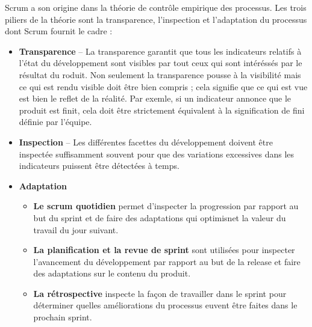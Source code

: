 \documentclass[12pt,a4paper,openany]{article}
\begin{document}
	Scrum a son origine dans la théorie de contrôle empirique des processus. Les trois piliers de la théorie sont la transparence, l'inspection et l'adaptation du processus dont Scrum fournit le cadre :
	\begin{itemize}
		\item \textbf{Transparence} -- La transparence garantit que tous les indicateurs relatifs à l'état du développement sont visibles par tout ceux qui sont intéréssés
			par le résultat du roduit. Non seulement la transparence pousse à la visibilité mais ce qui est rendu visible doit être bien compris ; 
			cela signifie que ce qui est vue est bien le reflet de la réalité. Par exemle, si un indicateur annonce que le produit est finit, cela doit être
			strictement équivalent à la signification de fini définie par l'équipe.
		\item \textbf{Inspection} -- Les différentes facettes du développement doivent être inspectée suffisamment souvent pour que des variations 
			excessives dans les indicateurs puissent être détectées à temps.
		\item \textbf{Adaptation}
			\begin{itemize}
				\item\textbf{Le scrum quotidien} permet d'inspecter la progression par rapport au but du sprint et de faire des adaptations qui optimisnet la valeur du travail du jour suivant.
				\item\textbf{La planification et la revue de sprint}  sont utilisées pour inspecter l'avancement du développement par rapport au but de la release et faire des adaptations sur le contenu du produit.
				\item \textbf{La rétrospective} inspecte la façon de travailler dans le sprint pour déterminer quelles améliorations du processus euvent être faites
					dans le prochain sprint.
			\end{itemize}
	\end{itemize}
\end{document}
